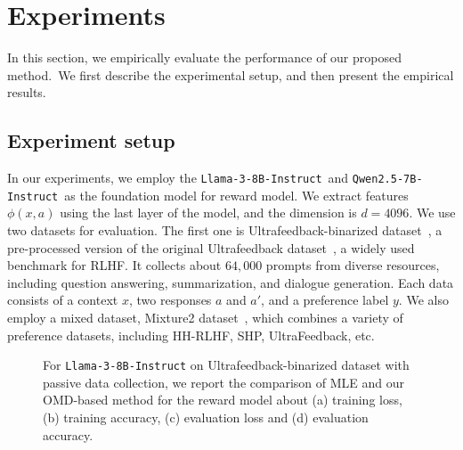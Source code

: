 \section{Experiments}
\label{sec:experiments}


In this section, we empirically evaluate the performance of our proposed method.~\footnotemark[1] We first describe the experimental setup, and then present the empirical results.

\subsection{Experiment setup}
In our experiments, we employ the \texttt{Llama-3-8B-Instruct}~\footnotemark[2] and \texttt{Qwen2.5-7B-Instruct}~\footnotemark[3] as the foundation model for reward model. We extract features $\phi(x,a)$ using the last layer of the model, and the dimension is $d=4096$. We use two datasets for evaluation. The first one is {Ultrafeedback-binarized dataset}~\footnotemark[4], a pre-processed version of the original Ultrafeedback dataset~\citep{arXiv'23:Ultrafeedback}, a widely used benchmark for RLHF. It collects about $64, 000$ prompts from diverse resources, including question answering, summarization, and dialogue generation. Each data consists of a context $x$, two responses $a$ and $a'$, and a preference label $y$. We also employ a mixed dataset, {Mixture2} dataset~\footnotemark[4], which combines a variety of preference datasets, including HH-RLHF, SHP, UltraFeedback, etc.



\begin{figure*}
    \begin{minipage}[t]{0.99\textwidth}
        \centering
        \hfill
        \hfill
        \hfill
    \end{minipage}
    \caption{For \texttt{Llama-3-8B-Instruct} on Ultrafeedback-binarized dataset with passive data collection, we report the comparison of MLE and our OMD-based method for the reward model about (a) training loss, (b) training accuracy, (c) evaluation loss and (d) evaluation accuracy.}
    \label{fig:training_passive}
\end{figure*}

